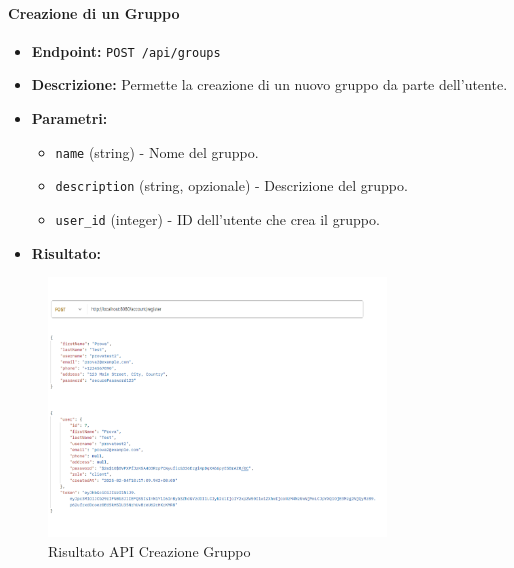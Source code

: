 \paragraph{Creazione di un Gruppo}
\begin{itemize}
    \item \textbf{Endpoint:} \texttt{POST /api/groups}
    \item \textbf{Descrizione:} Permette la creazione di un nuovo gruppo da parte dell'utente.
    \item \textbf{Parametri:}
    \begin{itemize}
        \item \texttt{name} (string) - Nome del gruppo.
        \item \texttt{description} (string, opzionale) - Descrizione del gruppo.
        \item \texttt{user\_id} (integer) - ID dell'utente che crea il gruppo.
    \end{itemize}
    \item \textbf{Risultato:}
\end{itemize}
\begin{figure}[h!]
    \centering
    \includegraphics[width=0.8\textwidth]{images/registerapi.png}
    \caption{Risultato API Creazione Gruppo}
    \label{fig:api_create_group}
\end{figure}

